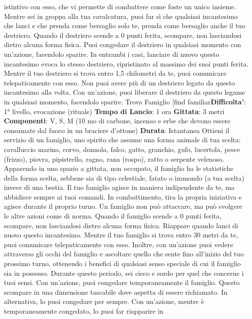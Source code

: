 \begin{multicols}{2}
istintivo con esso, che vi permette di combattere come
foste un unico insieme. Mentre sei in groppa alla tua
cavalcatura, puoi far sì che qualsiasi incantesimo che
lanci e che prenda come bersaglio solo te, prenda
come bersaglio anche il tuo destriero.
Quando il destriero scende a 0 punti ferita, scompare,
non lasciandosi dietro alcuna forma fisica. Puoi
congedare il destriero in qualsiasi momento con
un’azione, facendolo sparire. In entrambi i casi, lanciare
di nuovo questo incantesimo evoca lo stesso destriero,
ripristinato al massimo dei suoi punti ferita.
Mentre il tuo destriero si trova entro 1,5 chilometri da te,
puoi comunicare telepaticamente con esso.
Non puoi avere più di un destriero legato da questo
incantesimo alla volta. Con un’azione, puoi liberare il
destriero da questo legame in qualsiasi momento,
facendolo sparire.
Trova Famiglio
[find familiar\textbf{Difficolta'}:
1° livello, evocazione (rituale)
\textbf{Tempo di Lancio}: 1 ora
\textbf{Gittata}: 3 metri
\textbf{Componenti}: V, S, M (10 mo di carbone, incenso e
erbe che devono essere consumate dal fuoco in un
braciere d’ottone)
\textbf{Durata}: Istantanea
Ottieni il servizio di un famiglio, uno spirito che assume
una forma animale di tua scelta: cavalluccio marino,
corvo, donnola, falco, gatto, granchio, gufo, lucertola,
pesce (frizzo), piovra, pipistrello, ragno, rana (rospo),
ratto o serpente velenoso. Apparendo in uno spazio a
gittata, non occupato, il famiglio ha le statistiche della
forma scelta, sebbene sia di tipo celestiale, fatato o
immondo (a tua scelta) invece di una bestia.
Il tuo famiglio agisce in maniera indipendente da te, ma
ubbidisce sempre ai tuoi comandi. In combattimento,
tira la propria iniziativa e agisce durante il proprio turno.
Un famiglio non può attaccare, ma può svolgere le altre
azioni come di norma.
Quando il famiglio scende a 0 punti ferita, scompare,
non lasciandosi dietro alcuna forma fisica. Riappare
quando lanci di nuovo questo incantesimo.
Mentre il tuo famiglio si trova entro 30 metri da te, puoi
comunicare telepaticamente con esso. Inoltre, con
un’azione puoi vedere attraverso gli occhi del famiglio e
ascoltare quello che sente fino all’inizio del tuo
prossimo turno, ottenendo i benefici di qualsiasi senso
speciale di cui il famiglio sia in possesso. Durante
questo periodo, sei cieco e sordo per quel che
concerne i tuoi sensi.
Con un’azione, puoi congedare temporaneamente il
famiglio. Questo scompare in una dimensione tascabile
dove aspetta di essere richiamato. In alternativa, lo puoi
congedare per sempre. Con un’azione, mentre è
temporaneamente congedato, lo puoi far riapparire in

\end{multicols}
